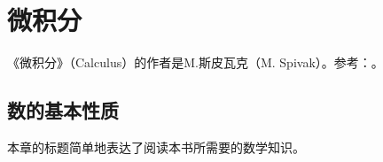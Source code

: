 \part{微积分}
《微积分》（Calculus）的作者是M.斯皮瓦克（M. Spivak）。参考：\cite{CalculusSpivak1981}。

\chapter{数的基本性质}\label{section00801}
本章的标题简单地表达了阅读本书所需要的数学知识。





